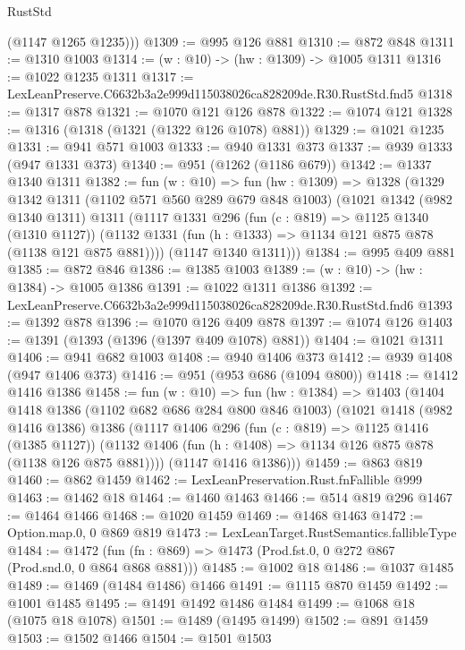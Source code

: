 \begin{lexlean}{RustStd}
\begin{coremodule}
        (@1147 @1265 @1235)))
@1309 := @995 @126 @881
@1310 := @872 @848
@1311 := @1310 @1003
@1314 := (w : @10) -> (hw : @1309) -> @1005 @1311
@1316 := @1022 @1235 @1311
@1317 := LexLeanPreserve.C6632b3a2e999d115038026ca828209de.R30.RustStd.fnd5
@1318 := @1317 @878
@1321 := @1070 @121 @126 @878
@1322 := @1074 @121
@1328 := @1316 (@1318 (@1321 (@1322 @126 @1078) @881))
@1329 := @1021 @1235
@1331 := @941 @571 @1003
@1333 := @940 @1331 @373
@1337 := @939 @1333 (@947 @1331 @373)
@1340 := @951 (@1262 (@1186 @679))
@1342 := @1337 @1340 @1311
@1382 := fun (w : @10) =>
  fun (hw : @1309) =>
  @1328
    (@1329
      @1342
      @1311
      (@1102 @571 @560 @289 @679 @848 @1003)
      (@1021
        @1342
        (@982 @1340 @1311)
        @1311
        (@1117
          @1331
          @296
          (fun (c : @819) => @1125 @1340 (@1310 @1127))
          (@1132 @1331 (fun (h : @1333) => @1134 @121 @875 @878 (@1138 @121 @875 @881))))
        (@1147 @1340 @1311)))
@1384 := @995 @409 @881
@1385 := @872 @846
@1386 := @1385 @1003
@1389 := (w : @10) -> (hw : @1384) -> @1005 @1386
@1391 := @1022 @1311 @1386
@1392 := LexLeanPreserve.C6632b3a2e999d115038026ca828209de.R30.RustStd.fnd6
@1393 := @1392 @878
@1396 := @1070 @126 @409 @878
@1397 := @1074 @126
@1403 := @1391 (@1393 (@1396 (@1397 @409 @1078) @881))
@1404 := @1021 @1311
@1406 := @941 @682 @1003
@1408 := @940 @1406 @373
@1412 := @939 @1408 (@947 @1406 @373)
@1416 := @951 (@953 @686 (@1094 @800))
@1418 := @1412 @1416 @1386
@1458 := fun (w : @10) =>
  fun (hw : @1384) =>
  @1403
    (@1404
      @1418
      @1386
      (@1102 @682 @686 @284 @800 @846 @1003)
      (@1021
        @1418
        (@982 @1416 @1386)
        @1386
        (@1117
          @1406
          @296
          (fun (c : @819) => @1125 @1416 (@1385 @1127))
          (@1132 @1406 (fun (h : @1408) => @1134 @126 @875 @878 (@1138 @126 @875 @881))))
        (@1147 @1416 @1386)))
@1459 := @863 @819
@1460 := @862 @1459
@1462 := LexLeanPreservation.Rust.fnFallible @999
@1463 := @1462 @18
@1464 := @1460 @1463
@1466 := @514 @819 @296
@1467 := @1464 @1466
@1468 := @1020 @1459
@1469 := @1468 @1463
@1472 := Option.map.{0, 0} @869 @819
@1473 := LexLeanTarget.RustSemantics.fallibleType
@1484 := @1472
    (fun (fn : @869) => @1473 (Prod.fst.{0, 0} @272 @867 (Prod.snd.{0, 0} @864 @868 @881)))
@1485 := @1002 @18
@1486 := @1037 @1485
@1489 := @1469 (@1484 @1486) @1466
@1491 := @1115 @870 @1459
@1492 := @1001 @1485
@1495 := @1491 @1492 @1486 @1484
@1499 := @1068 @18 (@1075 @18 @1078)
@1501 := @1489 (@1495 @1499)
@1502 := @891 @1459
@1503 := @1502 @1466
@1504 := @1501 @1503

\end{coremodule}
\end{lexlean}

